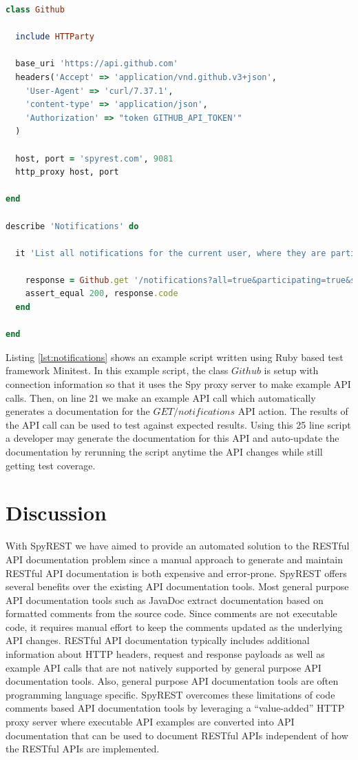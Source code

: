 \documentclass[conference]{IEEEtran}
\begin{document}
\begin{lstlisting}[language=ruby, breaklines=true, caption={}, label=list:ex, float,floatplacement=H, caption=Example API call using SpyREST, label={lst:notifications}]
class Github

  include HTTParty

  base_uri 'https://api.github.com'
  headers('Accept' => 'application/vnd.github.v3+json',
    'User-Agent' => 'curl/7.37.1',
    'content-type' => 'application/json',
    'Authorization' => "token GITHUB_API_TOKEN'"
  )

  host, port = 'spyrest.com', 9081
  http_proxy host, port

end

describe 'Notifications' do

  it 'List all notifications for the current user, where they are participating, since a time' do

    response = Github.get '/notifications?all=true&participating=true&since=2014-01-01T00:00:00Z'
    assert_equal 200, response.code
  end

end\end{lstlisting}

Listing \ref{lst:notifications} shows an example script written using Ruby based test framework Minitest. In this example script, the class $Github$ is setup with connection information so that it uses the Spy proxy server to make example API calls. Then, on line 21 we make an example API call which automatically generates a documentation for the $GET /notifications$ API action. The results of the API call can be used to test against expected results. Using this 25 line script a developer may generate the documentation for this API and auto-update the documentation by rerunning the script anytime the API changes while still getting test coverage.

\section{Discussion}
With SpyREST we have aimed to provide an automated solution to the RESTful API documentation problem since a manual approach to generate and maintain RESTful API documentation is both expensive and error-prone. SpyREST offers several benefits over the existing API documentation tools. Most general purpose API documentation tools such as JavaDoc extract documentation based on formatted comments from the source code. Since comments are not executable code, it requires manual effort to keep the comments updated as the underlying API changes. RESTful API documentation typically includes additional information about HTTP headers, request and response payloads as well as example API calls that are not natively supported by general purpose API documentation tools. Also, general purpose API documentation tools are often programming language specific. SpyREST overcomes these limitations of code comments based API documentation tools by leveraging a ``value-added'' HTTP proxy server where executable API examples are converted into API documentation that can be used to document RESTful APIs independent of how the RESTful APIs are implemented.
\end{document}
